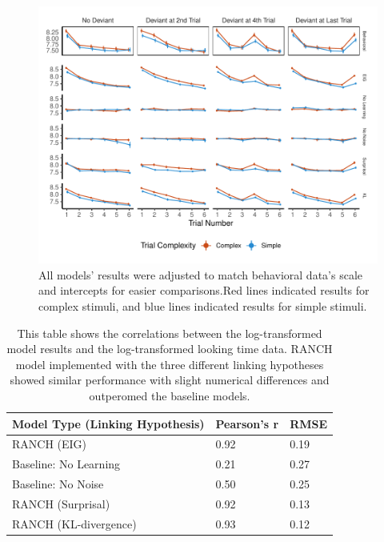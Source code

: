 \documentclass[10pt, letterpaper]{article}
\newenvironment{CodeChunk}{}{}
\begin{document}
\begin{CodeChunk}
\begin{figure}[t!]

{\centering \includegraphics{figs/experiment_res-1} 

}

\caption[All models’ results were adjusted to match behavioral data’s scale and intercepts for easier comparisons.Red lines indicated results for complex stimuli, and blue lines indicated results for simple stimuli]{All models’ results were adjusted to match behavioral data’s scale and intercepts for easier comparisons.Red lines indicated results for complex stimuli, and blue lines indicated results for simple stimuli.}\label{fig:experiment_res}
\end{figure}
\end{CodeChunk}

\begin{table}[ht]
\centering
\begin{tabular}{lll}
  \hline
Model Type (Linking Hypothesis) & Pearson's r & RMSE \\ 
  \hline
RANCH (EIG) & 0.92 & 0.19 \\ 
  Baseline: No Learning & 0.21 & 0.27 \\ 
  Baseline: No Noise & 0.50 & 0.25 \\ 
  RANCH (Surprisal) & 0.92 & 0.13 \\ 
  RANCH (KL-divergence) & 0.93 & 0.12 \\ 
   \hline
\end{tabular}
\caption{This table shows the correlations between the log-transformed model results and the log-transformed looking time data. RANCH model implemented with the three different linking hypotheses showed similar performance with slight numerical differences and outperomed the baseline models.} 
\end{table}
\end{document}
